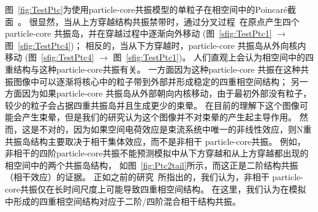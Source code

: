 图~\ref{fig:TestPtc}为使用particle-core共振模型的单粒子在相空间中的Poincar\'{e}截面~\cite{27,28}。
很显然，当从上方穿越结构共振禁带时，通过分叉过程~\cite{29,30}在原点产生四个particle-core 共振岛，并在穿越过程中逐渐向外移动
(图~\ref{sfig:TestPtc1} $\rightarrow$ 图~\ref{sfig:TestPtc4})；
相反的，当从下方穿越时，particle-core 共振岛从外向核内移动
(图~\ref{sfig:TestPtc4} $\rightarrow$ 图~\ref{sfig:TestPtc1})。
人们直观上会认为相空间中的四重结构与这种particle-core共振有关。
一方面因为这种particle-core 共振在这种共振图像中可以逐渐将核心中的粒子带到外部并形成稳定的四重相空间结构；
另一方面因为如果particle-core 共振岛从外部朝向内核移动，由于最初外部没有粒子，较少的粒子会占据四重共振岛并且生成更少的束晕。
在目前的理解下这个图像可能会产生束晕，但是我们的研究认为这个图像并不对束晕的产生起主导作用。
然而，这是不对的，因为如果空间电荷效应是束流系统中唯一的非线性效应，则N重共振岛结构主要取决于相干集体效应，而不是非相干 particle-core共振。
例如，非相干的四阶particle-core共振不能预测模拟中从下方穿越和从上方穿越都出现的相空间中的两个共振岛结构，
如图~\ref{fig:Ptc2tail}所示，而这正是二阶结构共振（相干效应）的证据。
正如之前的研究~\cite{17}所指出的，我们认为，非相干 particle-core共振仅在长时间尺度上可能导致四重相空间结构。
在这里，我们认为在模拟中形成的四重相空间结构对应于二阶/四阶混合相干结构共振。

